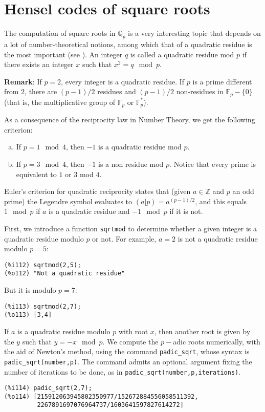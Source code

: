 \documentclass[fleqn]{cas-sc}
\begin{document}
\section{Hensel codes of square roots}\label{sec6}

\noindent The computation of square roots in $\mathbb{Q}_p$ is a very interesting
topic that depends on a lot of number-theoretical notions, among which that of a
quadratic residue is the most important (see \cite{9,12}).
An integer $q$ is called a quadratic residue mod $p$ if there exists an
integer $x$ such that  $x^2 =q \mod p$.

\noindent\textbf{Remark}: If $p=2$, every integer is a quadratic residue. 
If $p$ is a prime different from $2$, there are $(p-1)/2$ residues and 
$(p-1)/2$ non-residues in $\mathbb{F}_p-\{0\}$ (that is, the multiplicative
group of $\mathbb{F}_p$ or $\mathbb{F}^*_p$).

As a consequence of the reciprocity law in Number Theory, we get the following criterion:
\begin{enumerate}[(a)]\renewcommand{\theenumi}{\alph{enumi}}
	\item If $p=1 \mod 4$, then $-1$ is a quadratic residue mod $p$.
	\item If $p=3 \mod 4$, then $-1$ is a non residue mod $p$.
	Notice that every prime is equivalent to $1$ or $3$ mod $4$.
\end{enumerate}

Euler's criterion for quadratic reciprocity states that (given $a \in \mathbb{Z}$
and $p$ an odd prime) the Legendre symbol evaluates to $(a|p)=a^{(p-1)/2}$, 
and this equals $1\mod p$  if $a$ is a quadratic residue and $-1\mod p$ if it is not.

First, we introduce a function \texttt{sqrtmod} to determine whether a given integer
is a quadratic residue modulo $p$ or not. For example, $a=2$ is not a quadratic residue
modulo $p=5$:
\begin{verbatim}
(%i112)	sqrtmod(2,5);
(%o112)	"Not a quadratic residue"
\end{verbatim}
But it is modulo $p=7$:
\begin{verbatim}
(%i113)	sqrtmod(2,7);
(%o113)	[3,4]
\end{verbatim}

If $a$ is a quadratic residue modulo $p$ with root $x$, then another root is
given by the $y$ such that $y=-x \mod p$. We compute the $p-$adic roots numerically,
with the aid of Newton's method, using the command \texttt{padic\_sqrt}, whose syntax is
\texttt{padic\_sqrt(number,p)}. The command admits an optional argument fixing the number
of iterations to be done, as in \texttt{padic\_sqrt(number,p,iterations)}.
\begin{verbatim}
(%i114)	padic_sqrt(2,7);
(%o114)	[215912063945802350977/152672884556058511392,
         2267891697076964737/1603641597827614272]
\end{verbatim}
\end{document}
